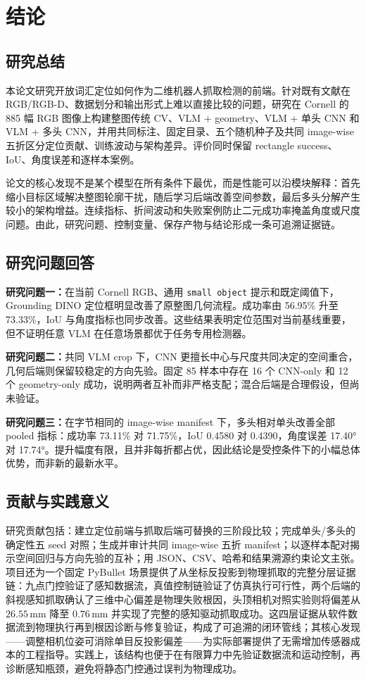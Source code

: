 \documentclass{l4proj}
\begin{document}
\chapter{结论}

\section{研究总结}
本论文研究开放词汇定位如何作为二维机器人抓取检测的前端。针对既有文献在 RGB/RGB-D、数据划分和输出形式上难以直接比较的问题，研究在 Cornell 的 885 幅 RGB 图像上构建整图传统 CV、VLM + geometry、VLM + 单头 CNN 和 VLM + 多头 CNN，并用共同标注、固定目录、五个随机种子及共同 image-wise 五折区分定位贡献、训练波动与架构差异。评价同时保留 rectangle success、IoU、角度误差和逐样本案例。

论文的核心发现不是某个模型在所有条件下最优，而是性能可以沿模块解释：首先缩小目标区域解决整图轮廓干扰，随后学习后端改善空间参数，最后多头分解产生较小的架构增益。连续指标、折间波动和失败案例防止二元成功率掩盖角度或尺度问题。由此，研究问题、控制变量、保存产物与结论形成一条可追溯证据链。

\section{研究问题回答}
\textbf{研究问题一：}在当前 Cornell RGB、通用 \texttt{small object} 提示和既定阈值下，Grounding DINO 定位框明显改善了原整图几何流程。成功率由 56.95\% 升至 73.33\%，IoU 与角度指标也同步改善。这些结果表明定位范围对当前基线重要，但不证明任意 VLM 在任意场景都优于任务专用检测器。

\textbf{研究问题二：}共同 VLM crop 下，CNN 更擅长中心与尺度共同决定的空间重合，几何后端则保留较稳定的方向先验。固定 85 样本中存在 16 个 CNN-only 和 12 个 geometry-only 成功，说明两者互补而非严格支配；混合后端是合理假设，但尚未验证。

\textbf{研究问题三：}在字节相同的 image-wise manifest 下，多头相对单头改善全部 pooled 指标：成功率 73.11\% 对 71.75\%，IoU 0.4580 对 0.4390，角度误差 17.40° 对 17.74°。提升幅度有限，且并非每折都占优，因此结论是受控条件下的小幅总体优势，而非新的最新水平。

\section{贡献与实践意义}
研究贡献包括：建立定位前端与抓取后端可替换的三阶段比较；完成单头/多头的确定性五 seed 对照；生成并审计共同 image-wise 五折 manifest；以逐样本配对揭示空间回归与方向先验的互补；用 JSON、CSV、哈希和结果溯源约束论文主张。项目还为一个固定 PyBullet 场景提供了从坐标反投影到物理抓取的完整分层证据链：九点门控验证了感知数据流，真值控制链验证了仿真执行可行性，两个后端的斜视感知抓取确认了三维中心偏差是物理失败根因，头顶相机对照实验则将偏差从 $26.55$\,mm 降至 $0.76$\,mm 并实现了完整的感知驱动抓取成功。这四层证据从软件数据流到物理执行再到根因诊断与修复验证，构成了可追溯的闭环管线；其核心发现——调整相机位姿可消除单目反投影偏差——为实际部署提供了无需增加传感器成本的工程指导。实践上，该结构也便于在有限算力中先验证数据流和运动控制，再诊断感知瓶颈，避免将静态门控通过误判为物理成功。
\end{document}
